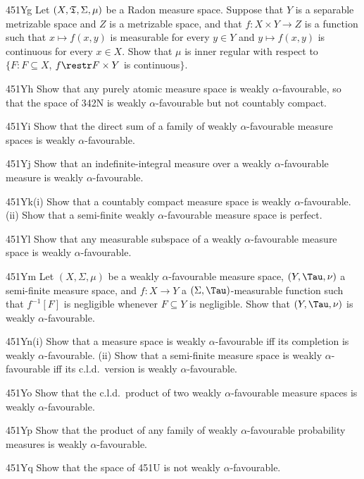 {\spheader 451Yg Let $(X,\frak T,\Sigma,\mu)$ be a Radon measure
space.   Suppose that $Y$ is a separable
metrizable space and $Z$ is a metrizable space, and that
$f:X\times Y\to Z$ is a function such that $x\mapsto f(x,y)$ is measurable
for every $y\in Y$ and $y\mapsto f(x,y)$ is continuous for every $x\in X$.
Show that $\mu$ is inner regular
with respect to $\{F:F\subseteq X$, $f\restr F\times Y$ is continuous$\}$.

\spheader 451Yh Show that any purely atomic measure space is weakly
$\alpha$-favourable, so that the space of 342N is weakly
$\alpha$-favourable but not countably compact.

\spheader 451Yi Show that the direct sum of a family of
weakly $\alpha$-favourable measure spaces is weakly $\alpha$-favourable.

\spheader 451Yj Show that an indefinite-integral measure over a
weakly $\alpha$-favourable measure is weakly $\alpha$-favourable.

\spheader 451Yk(i) Show that a countably compact measure space is
weakly $\alpha$-favourable.  (ii) Show that a semi-finite weakly
$\alpha$-favourable measure space is perfect.

\spheader 451Yl Show that any measurable subspace of a weakly
$\alpha$-favourable measure space is weakly $\alpha$-favourable.

\spheader 451Ym Let $(X,\Sigma,\mu)$ be a weakly $\alpha$-favourable
measure space, $(Y,\Tau,\nu)$ a semi-finite measure space, and $f:X\to
Y$ a $(\Sigma,\Tau)$-measurable function such that $f^{-1}[F]$ is
negligible whenever $F\subseteq Y$ is negligible.   Show that
$(Y,\Tau,\nu)$ is weakly $\alpha$-favourable.

\spheader 451Yn(i) Show that a measure space is weakly
$\alpha$-favourable iff its completion is
weakly $\alpha$-favourable.   (ii) Show that a semi-finite measure space
is weakly $\alpha$-favourable iff its c.l.d.\ version is weakly
$\alpha$-favourable.

\spheader 451Yo Show that the c.l.d.\ product of two weakly
$\alpha$-favourable measure spaces is weakly $\alpha$-favourable.

\spheader 451Yp Show that the product of
any family of weakly $\alpha$-favourable probability measures is weakly
$\alpha$-favourable.

\spheader 451Yq Show that the space of 451U is not weakly
$\alpha$-favourable.

}

